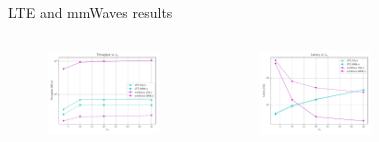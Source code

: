 \documentclass{beamer}
\begin{document}
	\begin{frame}{LTE and mmWaves results}
		\begin{columns}
				\begin{figure}
					\vspace{-0.2in}
					\includegraphics[scale=0.32]{throughput_lambda_bs_lte_mmwave_UDP}
				\end{figure}
				\begin{figure}
					\vspace{-0.3in}
					\includegraphics[scale=0.32]{latency_lambda_bs_lte_mmwave_UDP}
				\end{figure}
				\begin{figure}

\end{figure}
\end{columns}
\end{frame}
\end{document}
